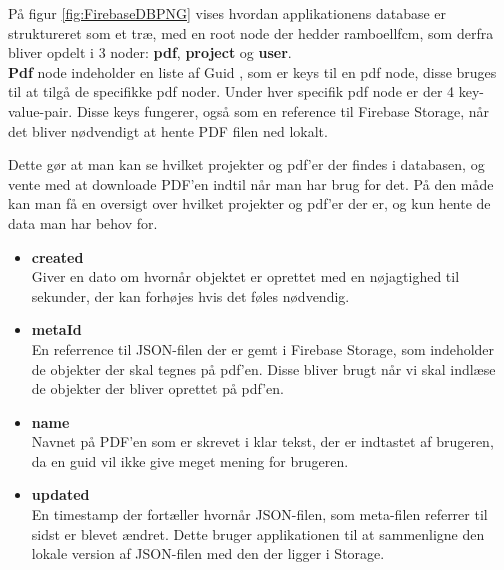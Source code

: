 På figur \ref{fig:FirebaseDBPNG} vises hvordan applikationens database er struktureret som et træ, med en root node\cite{rootNode} der hedder ramboellfcm, som derfra bliver opdelt i 3 noder:
\textbf{pdf}, \textbf{project} og \textbf{user}.\\

\textbf{Pdf} node indeholder en liste af Guid \cite{GUID}, som er keys til en pdf node, disse bruges til at tilgå de specifikke pdf noder. Under hver specifik pdf node er der 4 key-value-pair\cite{KVP}. Disse keys fungerer, også som en reference til Firebase Storage, når det bliver nødvendigt at hente PDF filen ned lokalt.

Dette gør at man kan se hvilket projekter og pdf'er der findes i databasen, og vente med at downloade PDF'en indtil når man har brug for det. På den måde kan man få en oversigt over hvilket projekter og pdf'er der er, og kun hente de data man har behov for. 
\begin{itemize}
	\item \textbf{created}\\
	Giver en dato om hvornår objektet er oprettet med en nøjagtighed til sekunder, der kan forhøjes hvis det føles nødvendig.\\
	\item \textbf{metaId}\\
	En referrence til JSON-filen der er gemt i Firebase Storage\cite{FirebaseStorage}, som indeholder de objekter der skal tegnes på pdf'en. Disse bliver brugt når vi skal indlæse de objekter der bliver oprettet på pdf'en.\\ 
	
	\item \textbf{name}\\
	Navnet på PDF'en som er skrevet i klar tekst, der er indtastet af brugeren, da en guid vil ikke give meget mening for brugeren.\\
	
	\item \textbf{updated}\\
	En timestamp der fortæller hvornår JSON-filen, som meta-filen referrer til sidst er blevet ændret. Dette bruger applikationen til at sammenligne den lokale version af JSON-filen med den der ligger i Storage.   
\end{itemize}

